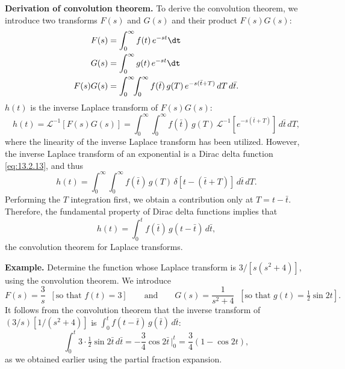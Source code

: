 \textbf{Derivation of convolution theorem.}
To derive the convolution theorem, we introduce two transforms $F(s)$ and $G(s)$ and their product $F(s)G(s)$:
\begin{align}
F(s) &= \int_0^{\infty} f(t)\,e^{-st}\dt \label{eq:13.2.15}\\
G(s) &= \int_0^{\infty} g(t)\,e^{-st}\dt \label{eq:13.2.16}\\
F(s)G(s) &= \int_0^{\infty}\!\!\int_0^{\infty} f(\bar{t})\,g(T)\,e^{-s(\bar{t}+T)}\,dT\,d\bar{t}. \label{eq:13.2.17}
\end{align}
$h(t)$ is the inverse Laplace transform of $F(s)G(s)$:
\[
h(t) = \mathcal{L}^{-1}[F(s)G(s)]
     = \int_0^{\infty}\!\!\int_0^{\infty} f(\bar{t})\,g(T)\,
       \mathcal{L}^{-1}\!\left[e^{-s(\bar{t}+T)}\right]\,d\bar{t}\,dT,
\]
where the linearity of the inverse Laplace transform has been utilized.  However, the inverse Laplace transform of an exponential is a Dirac delta function \eqref{eq:13.2.13}, and thus
\[
h(t) = \int_0^{\infty}\!\!\int_0^{\infty} f(\bar{t})\,g(T)\,\delta[t - (\bar{t}+T)]\,d\bar{t}\,dT.
\]
Performing the $T$ integration first, we obtain a contribution only at $T = t - \bar{t}$.
Therefore, the fundamental property of Dirac delta functions implies that
\[
h(t) = \int_0^{t} f(\bar{t})\,g(t-\bar{t})\,d\bar{t},
\]
the convolution theorem for Laplace transforms.

\textbf{Example.}
Determine the function whose Laplace transform is $3/[s(s^2+4)]$, using the convolution theorem.  We introduce
\[
F(s) = \frac{3}{s}\;\;[\text{so that } f(t) = 3]
\qquad\text{and}\qquad
G(s) = \frac{1}{s^2+4}\;\;\left[\text{so that } g(t) = \tfrac{1}{2}\sin 2t\right].
\]
It follows from the convolution theorem that the inverse transform of $(3/s)[1/(s^2+4)]$ is $\int_0^t f(t-\bar{t})\,g(\bar{t})\,d\bar{t}$:
\[
\int_0^t 3\cdot\tfrac{1}{2}\sin 2\bar{t}\,d\bar{t}
= -\frac{3}{4}\cos 2\bar{t}\,\bigg|_0^t
= \frac{3}{4}(1-\cos 2t),
\]
as we obtained earlier using the partial fraction expansion.


